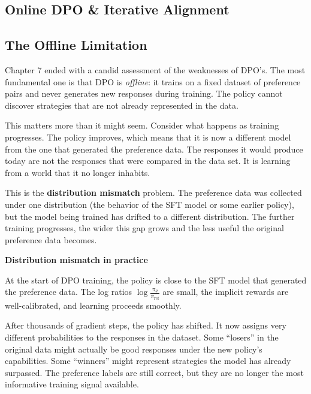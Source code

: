 \begin{chapterenv}

\chapter{Online DPO \& Iterative Alignment}

\section{The Offline Limitation}

Chapter 7 ended with a candid assessment of the weaknesses of DPO's. The most fundamental one is that DPO is \textit{offline}: it trains on a fixed dataset of preference pairs and never generates new responses during training. The policy cannot discover strategies that are not already represented in the data.

This matters more than it might seem. Consider what happens as training progresses. The policy improves, which means that it is now a different model from the one that generated the preference data. The responses it would produce today are not the responses that were compared in the data set. It is learning from a world that it no longer inhabits.

This is the \textbf{distribution mismatch} problem. The preference data was collected under one distribution (the behavior of the SFT model or some earlier policy), but the model being trained has drifted to a different distribution. The further training progresses, the wider this gap grows and the less useful the original preference data becomes.

\begin{infobox}
\textbf{Distribution mismatch in practice}

At the start of DPO training, the policy is close to the SFT model that generated the preference data. The log ratios $\log \frac{\pi_\theta}{\pi_{\text{ref}}}$ are small, the implicit rewards are well-calibrated, and learning proceeds smoothly.

After thousands of gradient steps, the policy has shifted. It now assigns very different probabilities to the responses in the dataset. Some ``losers'' in the original data might actually be good responses under the new policy's capabilities. Some ``winners'' might represent strategies the model has already surpassed. The preference labels are still correct, but they are no longer the most informative training signal available.


\end{infobox}
\end{chapterenv}
